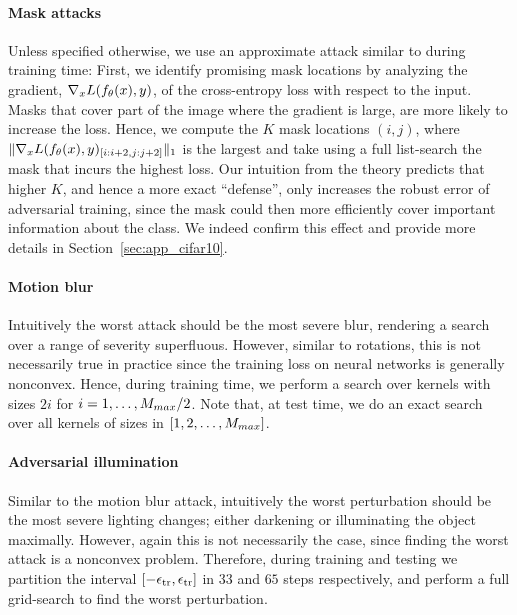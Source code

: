 \paragraph{Mask attacks}
Unless specified otherwise, we use an approximate attack similar to
\citet{Wu20} during training time:
First, we identify promising mask locations by analyzing the gradient, $\nabla_x L(f_\theta(x), y)$, of the cross-entropy loss with respect to the input. Masks that cover part of the image where the gradient is large, are more likely to increase the loss. Hence, we compute the $K$ mask locations $(i, j)$, where $\|\nabla_x L(f_\theta(x), y)_{[i:i+2, j:j+2]} \|_1$ is the largest and take using a full list-search the mask that incurs the highest loss.
Our intuition from the theory predicts that higher $K$,
and hence a more exact ``defense'', only increases the robust error of
adversarial training, since the mask could then more efficiently cover
important information about the class. We indeed confirm this effect
and provide more details in Section~\ref{sec:app_cifar10}.

\paragraph{Motion blur}
Intuitively the worst attack should be the most severe blur, rendering
a search over a range of severity superfluous.  However, similar to
rotations, this is not necessarily true in practice since the training loss on
neural networks is generally nonconvex. Hence, during training time,
we perform a search over kernels with sizes $2i$ for $i = 1,\dots,
M_{max}/2$. Note that, at test time, we do an exact search
over all kernels of sizes in $[1, 2, \dots, M_{max}]$.

\paragraph{Adversarial illumination}
Similar to the motion blur attack, intuitively the worst perturbation
should be the most severe lighting changes; either darkening or
illuminating the object maximally. However, again this is not
necessarily the case, since finding the worst attack is a nonconvex
problem. Therefore, during training and testing we partition the
interval $[-\epsilon_{\text{tr}}, \epsilon_{\text{tr}}]$ in $33$ and $65$ steps
respectively, and perform a full grid-search to find the worst
perturbation.


